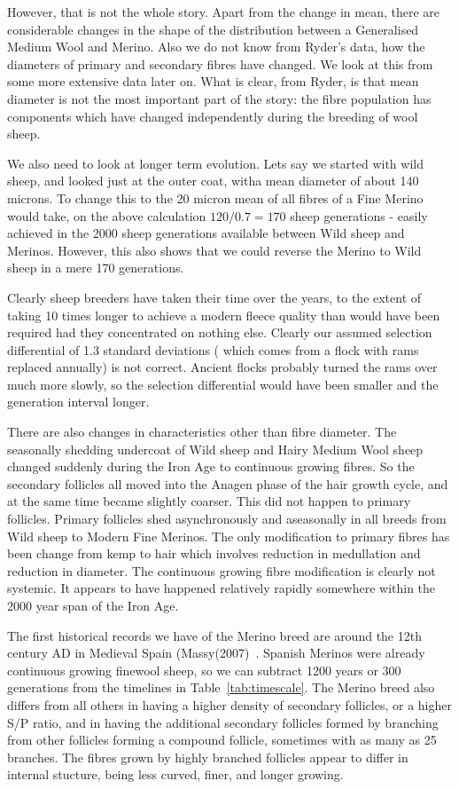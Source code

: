 \documentclass[titlepage]{article}  %
\begin{document}
However, that is not the whole story. Apart from the change in mean, there are considerable changes in the shape of the distribution between a Generalised Medium Wool and  Merino. Also we do not know from Ryder's data, how the diameters of primary and secondary fibres have changed. We look at this from some more extensive data later on. What is clear, from Ryder, is that mean diameter is not the most important part of the story: the fibre population has components which have changed independently during the breeding of wool sheep.

We also need to look at longer term evolution. Lets say we started with wild sheep, and looked just at the outer coat, witha mean diameter of about 140 microns. To change this to the 20 micron mean of all fibres of a Fine Merino would take, on the above calculation $120/0.7 = 170$ sheep generations - easily achieved in the 2000 sheep generations available between Wild sheep and Merinos. However, this also shows that we could reverse the Merino to Wild sheep in a mere 170 generations. 

Clearly sheep breeders have taken their time over the years, to the extent of taking 10 times longer to achieve a modern fleece quality than would have been required had they concentrated on nothing else. Clearly our assumed selection differential of 1.3 standard deviations ( which comes from a flock with rams replaced annually) is not correct. Ancient flocks probably turned the rams over much more slowly, so the selection differential would have been smaller and the generation interval longer.


There are also changes in characteristics other than fibre diameter. The seasonally shedding undercoat  of Wild sheep and Hairy Medium Wool sheep changed suddenly during the Iron Age to continuous growing fibres. So the secondary follicles all moved into the Anagen phase of the hair growth cycle, and at the same time became slightly coarser. This did not happen to primary follicles. Primary follicles shed asynchronously and aseasonally in all breeds from Wild sheep to Modern Fine Merinos. The only modification to primary fibres has been change from kemp to hair which involves reduction in medullation and reduction in diameter.   The continuous growing fibre modification is clearly not systemic. It appears to have happened relatively rapidly somewhere within the 2000 year span of the Iron Age. 

The first historical records we have of the Merino breed are around the 12th century AD in Medieval Spain (Massy(2007)~\cite{mass:07}. Spanish Merinos were already continuous growing finewool sheep, so we can subtract 1200 years or 300 generations from the timelines in Table~\ref{tab:timescale}.  The Merino breed also differs from all others in having a higher density of secondary follicles, or a higher S/P ratio, and in having the additional secondary follicles formed by branching from other follicles forming a compound follicle, sometimes with as many as 25 branches. The fibres grown by highly branched follicles appear to differ in internal stucture, being less curved, finer, and longer growing.  
\end{document}
